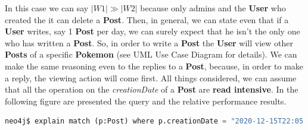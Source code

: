 In this case we can say $|W1| \gg |W2|$ because only admins and the \textbf{User} who created the it can delete a \textbf{Post}. Then, in general, we can state even that if a \textbf{User} writes, say 1 \textbf{Post} per day, we can surely expect that he isn't the only one who has written a \textbf{Post}. So, in order to write a \textbf{Post} the \textbf{User} will view other \textbf{Posts} of a specific \textbf{Pokemon} (see UML Use Case Diagram for details). We can make the same reasoning even to the replies to a \textbf{Post}, because, in order to make a reply, the viewing action will come first. All things considered, we can assume that all the operation on the \textit{creationDate} of a \textbf{Post} are \textbf{read intensive}. In the following figure are presented the query and the relative performance results.

\begin{lstlisting}[language=python]
	neo4j$ explain match (p:Post) where p.creationDate = "2020-12-15T22:05:32.382000000" return p
\end{lstlisting}

